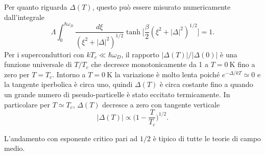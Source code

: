 Per quanto riguarda $\Delta(T)$, questo può essere misurato numericamente dall'integrale
\begin{equation}
    \Lambda\int_0^{\hbar\omega_D}\frac{d\xi}{(\xi^2 + |\Delta|^2)^{1/2}}\tanh{\bigg[\frac{\beta}{2}(\xi^2 + |\Delta|^2)^{1/2}\bigg]} = 1.
\end{equation}
Per i superconduttori con $kT_c \ll \hbar\omega_D$, il rapporto $|\Delta(T)|/|\Delta(0)|$ è una funzione universale di $T/T_c$ che decresce monotonicamente da 1 a $T = \SI{0}{\kelvin}$ fino a zero per $T = T_c$. Intorno a $T = \SI{0}{\kelvin}$ la variazione è molto lenta poiché $e^{-\Delta/kT} \simeq 0$ e la tangente iperbolica è circa uno, quindi $\Delta(T)$ è circa costante fino a quando un grande numero di pseudo-particelle è stato eccitato termicamente. In particolare per $T \simeq T_c$, $\Delta(T)$ decresce a zero con tangente verticale 
\begin{equation}
    |\Delta(T)| \propto \bigg(1 - \frac{T}{T_c}\bigg)^{1/2}.
\end{equation}
\begin{obs}
    L'andamento con esponente critico pari ad $1/2$ è tipico di tutte le teorie di campo medio.
\end{obs}

